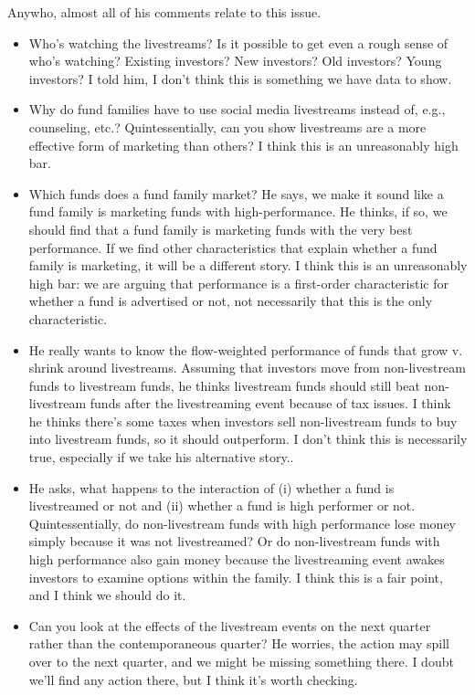 \documentclass[12pt]{article}
\begin{document}
Anywho, almost all of his comments relate to this issue.
\begin{itemize}
    \item Who's watching the livestreams? Is it possible to get even a rough sense of who's watching? Existing investors? New investors? Old investors? Young investors? I told him, I don't think this is something we have data to show.
    \item Why do fund families have to use social media livestreams instead of, e.g., counseling, etc.? Quintessentially, can you show livestreams are a more effective form of marketing than others? I think this is an unreasonably high bar.
    \item Which funds does a fund family market? He says, we make it sound like a fund family is marketing funds with high-performance. He thinks, if so, we should find that a fund family is marketing funds with the very best performance. If we find other characteristics that explain whether a fund family is marketing, it will be a different story. I think this is an unreasonably high bar: we are arguing that performance is a first-order characteristic for whether a fund is advertised or not, not necessarily that this is the only characteristic.
    \item He really wants to know the flow-weighted performance of funds that grow v. shrink around livestreams. Assuming that investors move from non-livestream funds to livestream funds, he thinks livestream funds should still beat non-livestream funds after the livestreaming event because of tax issues. I think he thinks there's some taxes when investors sell non-livestream funds to buy into livestream funds, so it should outperform. I don't think this is necessarily true, especially if we take his alternative story..
    \item He asks, what happens to the interaction of (i) whether a fund is livestreamed or not and (ii) whether a fund is high performer or not. Quintessentially, do non-livestream funds with high performance lose money simply because it was not livestreamed? Or do non-livestream funds with high performance also gain money because the livestreaming event awakes investors to examine options within the family. I think this is a fair point, and I think we should do it.
    \item Can you look at the effects of the livestream events on the next quarter rather than the contemporaneous quarter? He worries, the action may spill over to the next quarter, and we might be missing something there. I doubt we'll find any action there, but I think it's worth checking.

\end{itemize}
\end{document}
